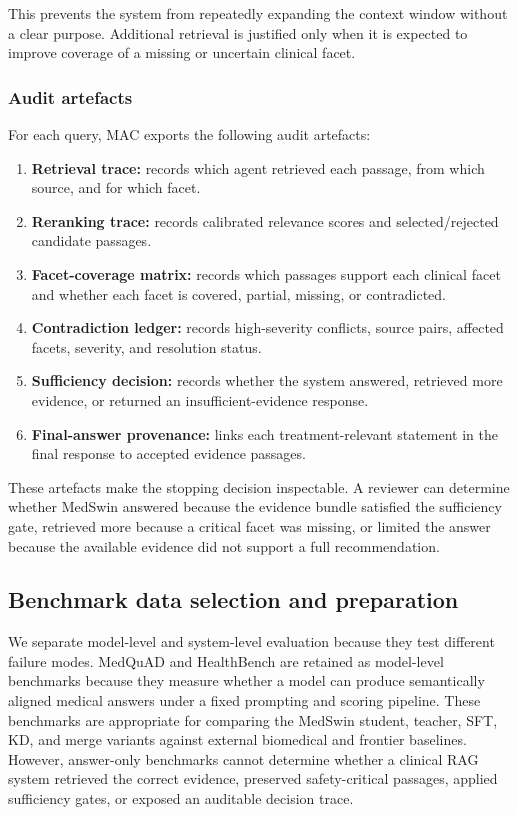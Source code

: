 \documentclass[conference]{IEEEtran}
\begin{document}
This prevents the system from repeatedly expanding the context window without a clear purpose. Additional retrieval is justified only when it is expected to improve coverage of a missing or uncertain clinical facet.

\subsubsection*{Audit artefacts}

For each query, MAC exports the following audit artefacts:

\begin{enumerate}
    \item \textbf{Retrieval trace:} records which agent retrieved each passage, from which source, and for which facet.
    \item \textbf{Reranking trace:} records calibrated relevance scores and selected/rejected candidate passages.
    \item \textbf{Facet-coverage matrix:} records which passages support each clinical facet and whether each facet is covered, partial, missing, or contradicted.
    \item \textbf{Contradiction ledger:} records high-severity conflicts, source pairs, affected facets, severity, and resolution status.
    \item \textbf{Sufficiency decision:} records whether the system answered, retrieved more evidence, or returned an insufficient-evidence response.
    \item \textbf{Final-answer provenance:} links each treatment-relevant statement in the final response to accepted evidence passages.
\end{enumerate}

These artefacts make the stopping decision inspectable. A reviewer can determine whether MedSwin answered because the evidence bundle satisfied the sufficiency gate, retrieved more because a critical facet was missing, or limited the answer because the available evidence did not support a full recommendation.


\subsection{Benchmark data selection and preparation}
We separate model-level and system-level evaluation because they test different failure modes. MedQuAD and HealthBench are retained as model-level benchmarks because they measure whether a model can produce semantically aligned medical answers under a fixed prompting and scoring pipeline. These benchmarks are appropriate for comparing the MedSwin student, teacher, SFT, KD, and merge variants against external biomedical and frontier baselines. However, answer-only benchmarks cannot determine whether a clinical RAG system retrieved the correct evidence, preserved safety-critical passages, applied sufficiency gates, or exposed an auditable decision trace.
\end{document}
